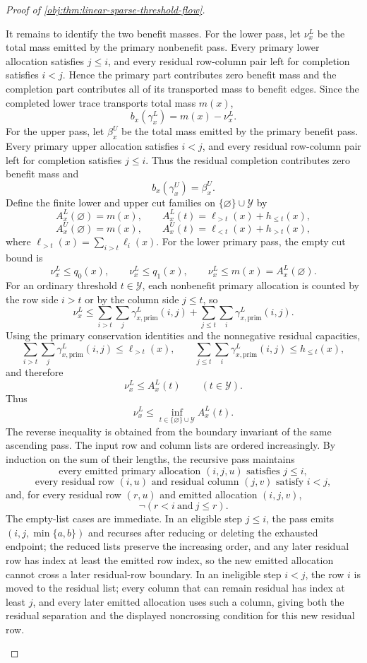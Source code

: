 \documentclass[11pt]{article}
\begin{document}
\begin{proof}[Proof of \cref{obj:thm:linear-sparse-threshold-flow}]
\begin{enumerate}
It remains to identify the two benefit masses.  For the lower pass, let \(\nu_x^L\) be the total mass emitted by the primary nonbenefit pass.  Every primary lower allocation satisfies \(j\le i\), and every residual row-column pair left for completion satisfies \(i<j\).  Hence the primary part contributes zero benefit mass and the completion part contributes all of its transported mass to benefit edges.  Since the completed lower trace transports total mass \(m(x)\),
\[
b_x(\gamma_x^L)=m(x)-\nu_x^L.
\]
For the upper pass, let \(\beta_x^U\) be the total mass emitted by the primary benefit pass.  Every primary upper allocation satisfies \(i<j\), and every residual row-column pair left for completion satisfies \(j\le i\).  Thus the residual completion contributes zero benefit mass and
\[
b_x(\gamma_x^U)=\beta_x^U.
\]
Define the finite lower and upper cut families on \(\{\varnothing\}\cup\mathcal Y\) by
\[
A_x^L(\varnothing)=m(x),
\qquad
A_x^L(t)=\ell_{>t}(x)+h_{\le t}(x),
\]
\[
A_x^U(\varnothing)=m(x),
\qquad
A_x^U(t)=\ell_{<t}(x)+h_{>t}(x),
\]
where \(\ell_{>t}(x)=\sum_{i>t}\ell_i(x)\).  For the lower primary pass, the empty cut bound is
\[
\nu_x^L\le q_0(x),
\qquad
\nu_x^L\le q_1(x),
\qquad
\nu_x^L\le m(x)=A_x^L(\varnothing).
\]
For an ordinary threshold \(t\in\mathcal Y\), each nonbenefit primary allocation is counted by the row side \(i>t\) or by the column side \(j\le t\), so
\[
\nu_x^L
\le
\sum_{i>t}\sum_j\gamma_{x,\mathrm{prim}}^L(i,j)
+
\sum_{j\le t}\sum_i\gamma_{x,\mathrm{prim}}^L(i,j).
\]
Using the primary conservation identities and the nonnegative residual capacities,
\[
\sum_{i>t}\sum_j\gamma_{x,\mathrm{prim}}^L(i,j)
\le \ell_{>t}(x),
\qquad
\sum_{j\le t}\sum_i\gamma_{x,\mathrm{prim}}^L(i,j)
\le h_{\le t}(x),
\]
and therefore
\[
\nu_x^L\le A_x^L(t)
\qquad(t\in\mathcal Y).
\]
Thus
\[
\nu_x^L\le \inf_{t\in\{\varnothing\}\cup\mathcal Y}A_x^L(t).
\]
The reverse inequality is obtained from the boundary invariant of the same ascending pass.  The input row and column lists are ordered increasingly.  By induction on the sum of their lengths, the recursive pass maintains
\[
\text{every emitted primary allocation }(i,j,u)\text{ satisfies }j\le i,
\]
\[
\text{every residual row }(i,u)\text{ and residual column }(j,v)\text{ satisfy }i<j,
\]
and, for every residual row \((r,u)\) and emitted allocation \((i,j,v)\),
\[
\neg(r<i\ \text{and}\ j\le r).
\]
The empty-list cases are immediate.  In an eligible step \(j\le i\), the pass emits \((i,j,\min\{a,b\})\) and recurses after reducing or deleting the exhausted endpoint; the reduced lists preserve the increasing order, and any later residual row has index at least the emitted row index, so the new emitted allocation cannot cross a later residual-row boundary.  In an ineligible step \(i<j\), the row \(i\) is moved to the residual list; every column that can remain residual has index at least \(j\), and every later emitted allocation uses such a column, giving both the residual separation and the displayed noncrossing condition for this new residual row.


\end{enumerate}
\end{proof}
\end{document}

